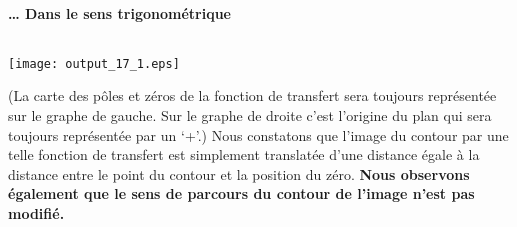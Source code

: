 \paragraph{\ldots{} Dans le sens trigonométrique\label{dans-le-sens-trigonomuxe9trique}}
\begin{tcolorbox}[breakable, size=fbox, boxrule=1pt, pad at break*=1mm,colback=cellbackground, colframe=cellborder]
\inputminted{python}{codes/python/annexe_cauchy_cellule8.py}
\end{tcolorbox}
\begin{center}
    \texttt{[image: output\_17\_1.eps]}
\end{center}
(La carte des pôles et zéros de la fonction de transfert sera toujours
représentée sur le graphe de gauche. Sur le graphe de droite c'est
l'origine du plan qui sera toujours représentée par un `+'.)
Nous constatons que l'image du contour par une telle fonction de
transfert est simplement translatée d'une distance égale à la distance
entre le point du contour et la position du zéro. \textbf{Nous observons
également que le sens de parcours du contour de l'image n'est pas
modifié.}
